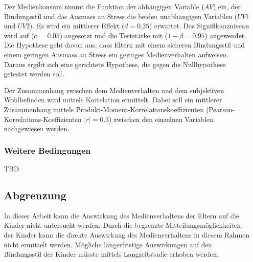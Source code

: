 Der Medienkonsum nimmt die Funktion der abhängigen Variable ($AV$) ein, der Bindungsstil und das Ausmass an Stress die beiden unabhängigen Variablen ($UV1$ und $UV2$). Es wird ein mittlerer Effekt ($d=0.25$) erwartet. Das Signifikanzniveau wird auf ($\alpha=0.05$) angesetzt und die Teststärke mit ($1-\beta=0.95$) angewendet.
Die Hypothese geht davon aus, dass Eltern mit einem sicheren Bindungsstil und einem geringen Ausmass an Stress ein geringes Medienverhalten aufweisen. Daraus ergibt sich eine gerichtete Hypothese, die gegen die Nullhypothese getestet werden soll.

Der Zusammenhang zwischen dem Medienverhalten und dem subjektiven Wohlbefinden wird mittels Korrelation ermittelt. Dabei soll ein mittlerer Zusammenhang mittels Produkt-Moment-Korrelationskoeffizienten (Pearson-Korrelations-Koeffizienten $|r|=0.3$) zwischen den einzelnen Variablen nachgewiesen werden.

\subsubsection{Weitere Bedingungen}
TBD
\subsection{Abgrenzung}
In dieser Arbeit kann die Auswirkung des Medienverhaltens der Eltern auf die Kinder nicht untersucht werden. Durch die begrenzte Mitteilungsmöglichkeiten der Kinder kann die direkte Auswirkung des Medienverhaltens in diesem Rahmen nicht ermittelt werden. Mögliche längerfristige Auswirkungen auf den Bindungsstil der Kinder müsste mittels Langzeitstudie erhoben werden. 

